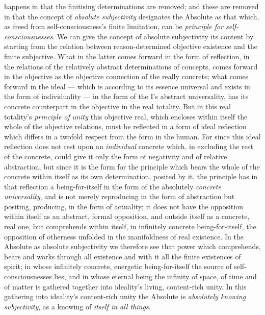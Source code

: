 \documentclass[12pt,a4paper]{book}
\begin{document}
happens in that the finitising determinations are removed; and these are
removed in that the concept of \emph{absolute subjectivity} designates the
Absolute as that which, as freed from self-consciousness's finite limitation,
can be \emph{principle for self-consciousnesses}. We can give the concept of
absolute subjectivity its content by starting from the relation between
reason-determined objective existence and the finite subjective. What in the
latter comes forward in the form of reflection, in the relations of the
relatively abstract determinations of concepts, comes forward in the objective
as the objective connection of the really concrete; what comes forward in the
ideal --- which is according to its essence universal and exists in the form
of individuality --- in the form of the I's abstract universality, has its
concrete counterpart in the objective in the real totality. But in this real
totality's \emph{principle of unity} this objective real, which encloses
within itself the whole of the objective relations, must be reflected in a
form of ideal reflection which differs in a twofold respect from the form in
the human. For since this ideal reflection does not rest upon an
\emph{individual} concrete which, in excluding the rest of the concrete, could
give it only the form of negativity and of relative abstraction,
but since it is the form for the principle which bears the whole of the
concrete within itself as its own determination, posited by it, the principle
has in that reflection a being-for-itself in the form of the absolutely
\emph{concrete universality}, and is not merely reproducing in the form of
abstraction but positing, producing, in the form of actuality; it does not
have the opposition within itself as an abstract, formal opposition, and
outside itself as a concrete, real one, but comprehends within itself, in
infinitely concrete being-for-itself, the opposition of otherness unfolded in
the manifoldness of real existence. In the Absolute as absolute subjectivity
we therefore see that power which comprehends, bears and works through all
existence and with it all the finite existences of spirit; in whose infinitely
concrete, energetic being-for-itself the source of self-consciousnesses lies,
and in whose eternal being the infinity of space, of time and of matter is
gathered together into ideality's living, content-rich unity. In this
gathering into ideality's content-rich unity the Absolute is \emph{absolutely
knowing subjectivity}, as a knowing of \emph{itself in all things}.
\end{document}
